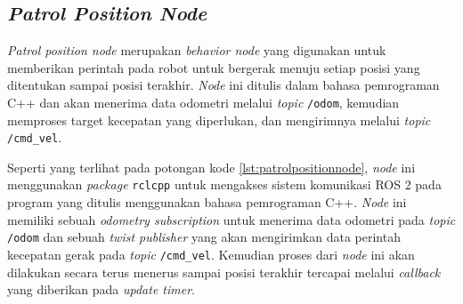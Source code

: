 \subsection{\emph{Patrol Position Node}}
\label{subsec:patrolpositionnode}

\emph{Patrol position node} merupakan \emph{behavior node} yang digunakan untuk memberikan perintah pada robot untuk bergerak menuju setiap posisi yang ditentukan sampai posisi terakhir.
\emph{Node} ini ditulis dalam bahasa pemrograman C++ dan akan menerima data odometri melalui \emph{topic} \lstinline{/odom},
  kemudian memproses target kecepatan yang diperlukan,
  dan mengirimnya melalui \emph{topic} \lstinline{/cmd_vel}.



Seperti yang terlihat pada potongan kode \ref{lst:patrolpositionnode},
  \emph{node} ini menggunakan \emph{package} \lstinline{rclcpp} untuk mengakses sistem komunikasi ROS 2 pada program yang ditulis menggunakan bahasa pemrograman C++.
\emph{Node} ini memiliki sebuah \emph{odometry subscription} untuk menerima data odometri pada \emph{topic} \lstinline{/odom} dan sebuah \emph{twist publisher} yang akan mengirimkan data perintah kecepatan gerak pada \emph{topic} \lstinline{/cmd_vel}.
Kemudian proses dari \emph{node} ini akan dilakukan secara terus menerus sampai posisi terakhir tercapai melalui \emph{callback} yang diberikan pada \emph{update timer}.
